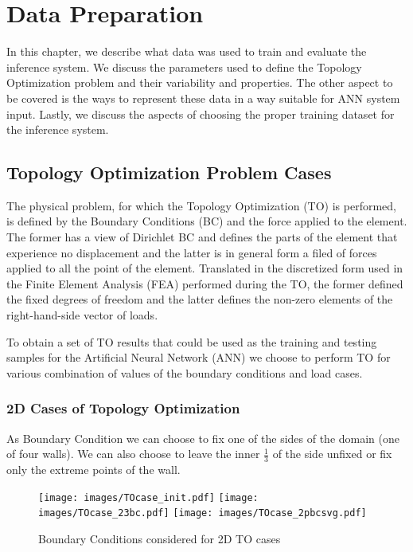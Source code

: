 
\chapter{Data Preparation}

In this chapter, we describe what data was used to train and evaluate the inference system.
We discuss the parameters used to define the Topology Optimization problem and their variability and properties.
The other aspect to be covered is the ways to represent these data in a way suitable for ANN system input.
Lastly, we discuss the aspects of choosing the proper training dataset for the inference system.
\medskip

\section{Topology Optimization Problem Cases}

The physical problem, for which the Topology Optimization (TO) is performed, is defined by the Boundary Conditions (BC) and the force applied to the element. 
The former has a view of Dirichlet BC and defines the parts of the element that experience no displacement and the latter is in general form a filed of forces applied to all the point of the element. 
Translated in the discretized form used in the Finite Element Analysis (FEA) performed during the TO, the former defined the fixed degrees of freedom and the latter defines the non-zero elements of the right-hand-side vector of loads.
\medskip

To obtain a set of TO results that could be used as the training and testing samples for the Artificial Neural Network (ANN) we choose to perform TO for various combination of values of the boundary conditions and load cases.
\medskip

\subsection{2D Cases of Topology Optimization}

As Boundary Condition we can choose to fix one of the sides of the domain (one of four walls). 
We can also choose to leave the inner $\frac{1}{3}$ of the side unfixed or fix only the extreme points of the wall. 
\begin{figure}
	\begin{multicols}{3}
	\texttt{[image: images/TOcase\_init.pdf]}
	\texttt{[image: images/TOcase\_23bc.pdf]}
	\texttt{[image: images/TOcase\_2pbcsvg.pdf]}
	\end{multicols}
	\caption{Boundary Conditions considered for 2D TO cases }
	\label{fig:3bcs}
\end{figure}
\medskip

